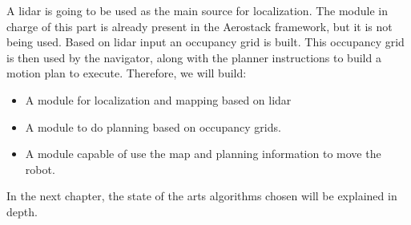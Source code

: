     A lidar is going to be used as the main source for localization. The module in charge of this part is already present in the Aerostack framework, but it is not being used. Based on lidar input an occupancy grid is built. This occupancy grid is then used by the navigator, along with the planner instructions to build a motion plan to execute. Therefore, we will build:
    
    \begin{itemize}
      \item A module for localization and mapping based on lidar
      \item A module to do planning based on occupancy grids.
      \item A module capable of use the map and planning information to move the robot.
    \end{itemize}

    In the next chapter, the state of the arts algorithms chosen will be explained in depth.

